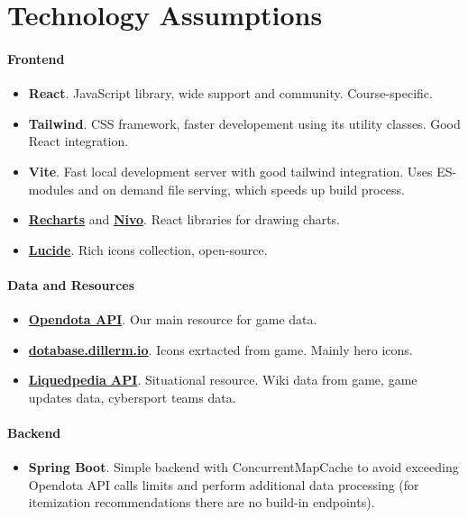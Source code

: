 \section{Technology Assumptions}

 \paragraph{Frontend}
\begin{itemize}

    \item \textbf{React}. JavaScript library, wide support and community. Course-specific.
    \item \textbf{Tailwind}. CSS framework, faster developement using its utility classes. Good React integration.
    \item \textbf{Vite}. Fast local development server with good tailwind integration.
    Uses ES-modules and on demand file serving, which speeds up build process.

    \item \textbf{\href{https://recharts.org}{Recharts}} and \textbf{\href{https://nivo.rocks/}{Nivo}}. React libraries for drawing charts.
    \item \textbf{\href{https://lucide.dev/}{Lucide}}. Rich icons collection, open-source.

\end{itemize}

\paragraph{Data and Resources}

\begin{itemize}

    \item \textbf{\href{https://docs.opendota.com/}{Opendota API}}. Our main resource for game data.
    \item \textbf{\href{https://dotabase.dillerm.io/}{dotabase.dillerm.io}}. Icons exrtacted from game. Mainly hero icons.
    \item \textbf{\href{https://liquipedia.net/dota2/Main_Page}{Liquedpedia API}}. Situational resource. Wiki data from game, game updates data, cybersport teams data.

\end{itemize}

\paragraph{Backend}

\begin{itemize}

    \item \textbf{Spring Boot}. Simple backend with ConcurrentMapCache to avoid exceeding Opendota API calls limits and
    perform additional data processing (for itemization recommendations there are no build-in endpoints).

\end{itemize}